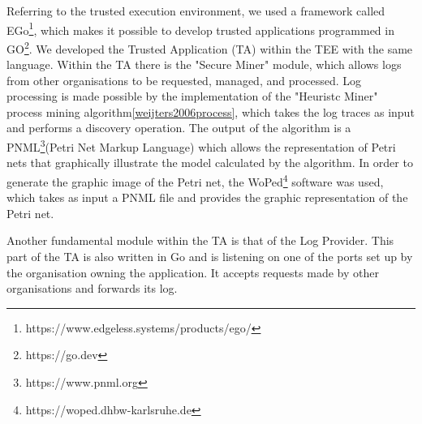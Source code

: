 Referring to the trusted execution environment, we used a framework called EGo\footnote{https://www.edgeless.systems/products/ego/}, which makes it possible to develop trusted applications programmed in GO\footnote{https://go.dev}. We developed the Trusted Application (TA) within the TEE with the same language. Within the TA there is the "Secure Miner"
module, which allows logs from other organisations to be requested, managed, and processed. Log processing is made possible by the implementation of the "Heuristc Miner" process mining algorithm\ref{weijters2006process}, which takes the log traces as input and performs a discovery operation.
The output of the algorithm is a PNML\footnote{https://www.pnml.org}(Petri Net Markup Language) which allows the representation of Petri nets that graphically illustrate the model calculated by the algorithm. 
In order to generate the graphic image of the Petri net, the WoPed\footnote{https://woped.dhbw-karlsruhe.de} software was used, which takes as input a PNML file and provides the graphic representation of the Petri net. 

Another fundamental module within the TA is that of the Log Provider. This part of the TA is also written in Go and is listening on one of the ports set up by the organisation owning the application. It accepts requests made by other organisations and forwards its log. 